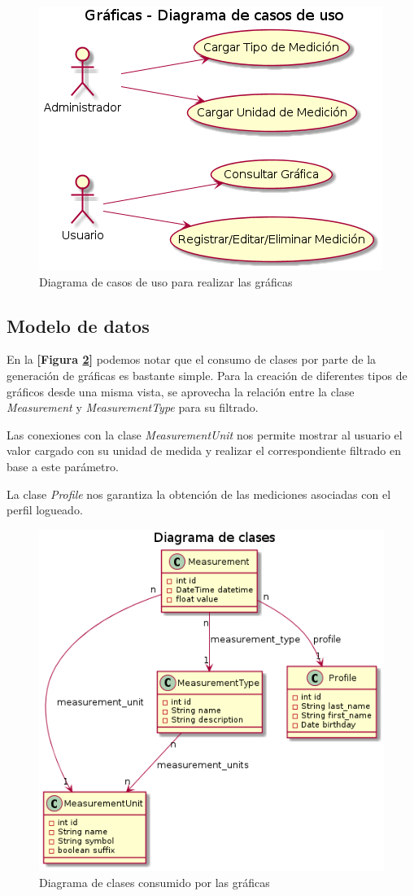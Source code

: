 \begin{figure}[h!]
	\centering
	\includegraphics[width=.8\textwidth]{img/5-cu-graficas}
	\caption{Diagrama de casos de uso para realizar las gráficas}
	\label{5-cu-graficas}
\end{figure}


\subsection{Modelo de datos} 

En la \textbf{[Figura \ref{5-clases-graficas}]} podemos notar que el consumo de clases por parte de la generación de gráficas es bastante simple. Para la creación de diferentes tipos de gráficos desde una misma vista, se aprovecha la relación entre la clase \textit{Measurement} y \textit{MeasurementType} para su filtrado.

Las conexiones con la clase \textit{MeasurementUnit} nos permite mostrar al usuario el valor cargado con su unidad de medida y realizar el correspondiente filtrado en base a este parámetro.

La clase \textit{Profile} nos garantiza la obtención de las mediciones asociadas con el perfil logueado.

\begin{figure}[h!]
	\centering
	\includegraphics[width=.8\textwidth]{img/5-clases-graficas}
	\caption{Diagrama de clases consumido por las gráficas}
	\label{5-clases-graficas}
\end{figure}

